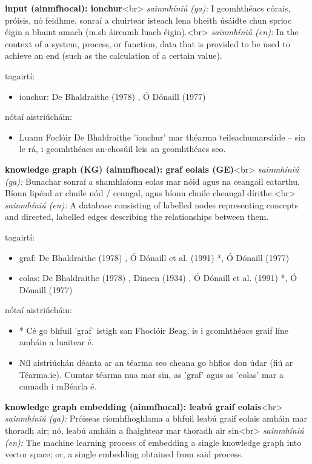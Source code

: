 \documentclass{article}
\begin{document}
\textbf{input (ainmfhocal): ionchur}<br>
\textit{sainmhíniú (ga):} I gcomhthéacs córais, próisis, nó feidhme, sonraí a chuirtear isteach lena bheith úsáidte chun sprioc éigin a bhaint amach (m.sh áireamh luach éigin).<br>
\textit{sainmhíniú (en):} In the context of a system, process, or function, data that is provided to be used to achieve an end (such as the calculation of a certain value).

tagairtí:
\begin{itemize}
	\item ionchur: De Bhaldraithe (1978) \cite{de-bhaldraithe}, Ó Dónaill (1977) \cite{odonaill}
\end{itemize}

nótaí aistriúcháin:
\begin{itemize}
	\item Luann Foclóir De Bhaldraithe 'ionchur' mar théarma teileachumarsáide -- sin le rá, i gcomhthéacs an-chosúil leis an gcomhthéacs seo.
\end{itemize}


\textbf{knowledge graph (KG) (ainmfhocal): graf eolais (GE)}<br>
\textit{sainmhíniú (ga):} Bunachar sonraí a shamhlaíonn eolas mar nóid agus na ceangail eatarthu. Bíonn lipéad ar chuile nód / ceangal, agus bíonn chuile cheangal dírithe.<br>
\textit{sainmhíniú (en):} A database consisting of labelled nodes representing concepts and directed, labelled edges describing the relationships between them.

tagairtí:
\begin{itemize}
	\item graf: De Bhaldraithe (1978) \cite{de-bhaldraithe}, Ó Dónaill et al. (1991) \cite{focloir-beag}*, Ó Dónaill (1977) \cite{odonaill}
	\item eolas: De Bhaldraithe (1978) \cite{de-bhaldraithe}, Dineen (1934) \cite{dineen}, Ó Dónaill et al. (1991) \cite{focloir-beag}*, Ó Dónaill (1977) \cite{odonaill}
\end{itemize}

nótaí aistriúcháin:
\begin{itemize}
	\item * Cé go bhfuil 'graf' istigh san Fhoclóir Beag, is i gcomhthéacs graif líne amháin a luaitear é.
	\item Níl aistriúchán déanta ar an téarma seo cheana go bhfios don údar (fiú ar Téarma.ie). Cumtar téarma nua mar sin, as 'graf' agus as 'eolas' mar a cumadh i mBéarla é.
\end{itemize}


\textbf{knowledge graph embedding (ainmfhocal): leabú graif eolais}<br>
\textit{sainmhíniú (ga):} Próiseas ríomhfhoghlama a bhfuil leabú graif eolais amháin mar thoradh air; nó, leabú amháin a fhaightear mar thoradh air sin<br>
\textit{sainmhíniú (en):} The machine learning process of embedding a single knowledge graph into vector space; or, a single embedding obtained from said process.
\end{document}

